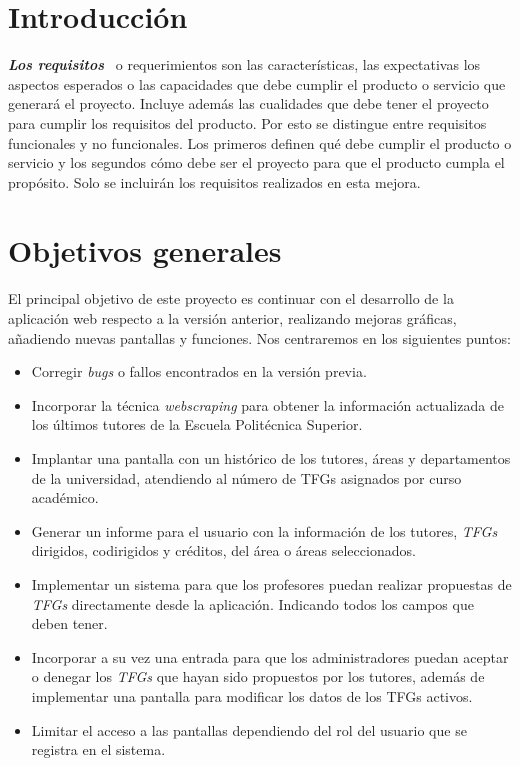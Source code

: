 
\section{Introducción}

\textbf{\textit{Los requisitos}}~\cite{Requisito} o requerimientos son las características, las expectativas los aspectos esperados o las capacidades que debe cumplir el producto o servicio que generará el proyecto. Incluye además las cualidades que debe tener el proyecto para cumplir los requisitos del producto. Por esto se distingue entre requisitos funcionales y no funcionales. Los primeros definen qué debe cumplir el producto o servicio y los segundos cómo debe ser el proyecto para que el producto cumpla el propósito.
Solo se incluirán los requisitos realizados en esta mejora.

\section{Objetivos generales}
El principal objetivo de este proyecto es continuar con el desarrollo de la aplicación web respecto a la versión anterior, realizando mejoras gráficas, añadiendo nuevas pantallas y funciones.
Nos centraremos en los siguientes puntos:
\begin{itemize}
	\item Corregir \emph{bugs} o fallos encontrados en la versión previa.
	\item Incorporar la técnica \emph{webscraping} para obtener la información actualizada de los últimos tutores de la Escuela Politécnica Superior.
	\item Implantar una pantalla con un histórico de los tutores, áreas y departamentos de la universidad, atendiendo al número de TFGs asignados por curso académico. 
	\item Generar un informe para el usuario con la información de los tutores, \emph{TFGs} dirigidos, codirigidos y créditos, del área o áreas seleccionados.
	\item Implementar un sistema para que los profesores puedan realizar propuestas de \emph{TFGs} directamente desde la aplicación. Indicando todos los campos que deben tener. 
	\item Incorporar a su vez una entrada para que los administradores puedan aceptar o denegar los \emph{TFGs} que hayan sido propuestos por los tutores, además de implementar una pantalla para modificar los datos de los TFGs activos.
	\item Limitar el acceso a las pantallas dependiendo del rol del usuario que se registra en el sistema.
\end{itemize}

